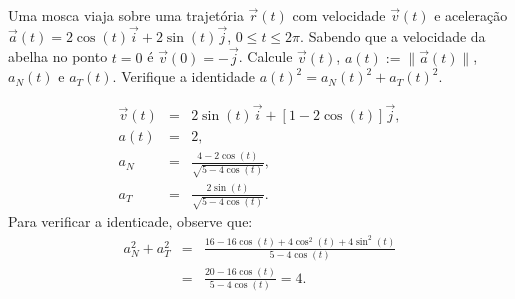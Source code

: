 \begin{exer} Uma mosca viaja sobre uma trajetória $\vec{r}(t)$ com velocidade $\vec{v}(t)$ e aceleração $\vec{a}(t)=2\cos(t)\vec{i}+2\sin(t)\vec{j}$, $0\leq t\leq 2\pi$. Sabendo que a velocidade da abelha no ponto $t=0$ é $\vec{v}(0)=-\vec{j}$. Calcule $\vec{v}(t)$, $a(t):=\|\vec{a}(t)\|$, $a_N(t)$ e $a_T(t)$. Verifique a identidade $a(t)^2=a_N(t)^2+a_T(t)^2$.

\end{exer}
\begin{resp}
  \begin{eqnarray*}
    \vec{v}(t) &=& 2\sin(t)\vec{i} + \left[1-2\cos(t)\right]\vec{j},\\
  a(t) &=& 2,\\
  a_N&=&\frac{4-2\cos(t)}{\sqrt{5-4\cos(t)}},\\
  a_T&=&\frac{2\sin(t)}{\sqrt{5-4\cos(t)}}.
  \end{eqnarray*}
  Para verificar a identicade, observe que:
  \begin{eqnarray*}
  a_N^2+a_T^2&=&\frac{16-16\cos(t)+4\cos^2(t)+4\sin^2(t)}{{5-4\cos(t)}}\\
  &=&\frac{20-16\cos(t)}{{5-4\cos(t)}}=4.
  \end{eqnarray*}
\end{resp}


 















